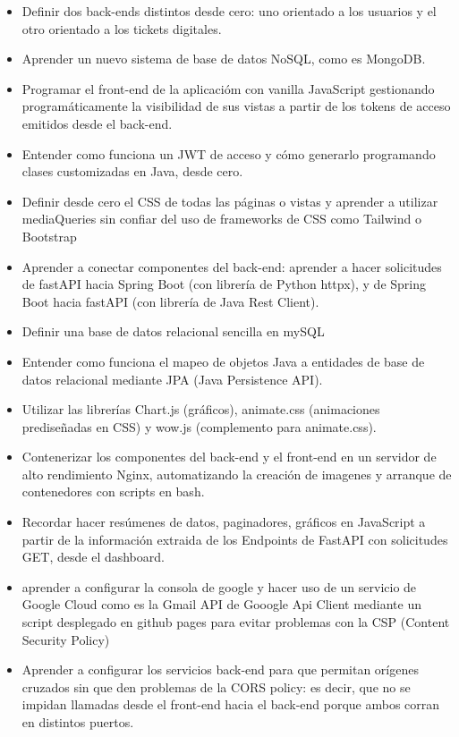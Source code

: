 \documentclass[a4paper,12pt]{report}
\begin{document}
	\begin{itemize}
		\setlength{\itemsep}{.0em}
		\item Definir dos back-ends distintos desde cero: uno orientado a los usuarios y el otro orientado a los tickets digitales.
		\item Aprender un nuevo sistema de base de datos NoSQL, como es MongoDB.
		\item Programar el front-end de la aplicacióm con vanilla JavaScript gestionando programáticamente la  visibilidad de sus vistas a partir de los tokens de acceso emitidos desde el back-end.
		\item Entender como funciona un JWT de acceso y cómo generarlo programando clases customizadas en Java, desde cero.
		\item Definir desde cero el CSS de todas las páginas o vistas y aprender a utilizar mediaQueries sin confiar del uso de frameworks de CSS como Tailwind o Bootstrap
		\item Aprender a conectar componentes del back-end: aprender a hacer solicitudes de fastAPI hacia Spring Boot (con librería de Python httpx), y de Spring Boot hacia fastAPI (con librería de Java Rest Client).
		\item Definir una base de datos relacional sencilla en mySQL
		\item Entender como funciona el mapeo de objetos Java a entidades de base de datos relacional mediante JPA (Java Persistence API).
		\item Utilizar las librerías Chart.js (gráficos), animate.css (animaciones prediseñadas en CSS) y wow.js (complemento para animate.css).
		\item Contenerizar los componentes del back-end y el front-end en un servidor de alto rendimiento Nginx, automatizando la creación de imagenes y arranque de contenedores con scripts en bash.
		\item Recordar hacer resúmenes de datos, paginadores, gráficos en JavaScript a partir de la información extraida de los Endpoints de FastAPI con solicitudes GET, desde el dashboard.
		\item aprender a configurar la consola de google y hacer uso de un servicio de Google Cloud como es la Gmail API de Gooogle Api Client mediante un script desplegado en github pages para evitar problemas con la CSP (Content Security Policy)
		\item Aprender a configurar los servicios back-end para que permitan orígenes cruzados sin que den problemas de la CORS policy: es decir, que no se impidan llamadas desde el front-end hacia el back-end porque ambos corran en distintos puertos.
	\end{itemize}
	
\end{document}
